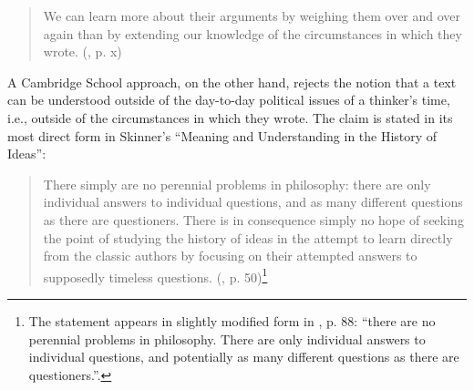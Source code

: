 \documentclass[11pt]{article}
\begin{document}
\begin{quote}
	We can learn more about their arguments by weighing them over and over again than by extending our knowledge of the circumstances in which they wrote. (\cite{plamenatz_man_1963}, p. x)
\end{quote}
	
	
A Cambridge School approach, on the other hand, rejects the notion that a text can be understood outside of the day-to-day political issues of a thinker's time, i.e., outside of the circumstances in which they wrote. The claim is stated in its most direct form in Skinner's ``Meaning and Understanding in the History of Ideas'':
	
\begin{quote}
	There simply are no perennial problems in philosophy: there are only individual answers to individual questions, and as many different questions as there are questioners. There is in consequence simply no hope of seeking the point of studying the history of ideas in the attempt to learn directly from the classic authors by focusing on their attempted answers to supposedly timeless questions. (\cite{skinner_meaning_1969}, p. 50)\footnote{The statement appears in slightly modified form in \cite{skinner_visions_2012}, p. 88: ``there are no perennial problems in philosophy. There are only individual answers to individual questions, and potentially as many different questions as there are questioners.''.}
\end{quote}
	
\end{document}
